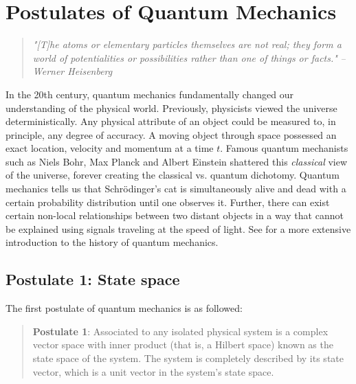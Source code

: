 
\chapter{Postulates of Quantum Mechanics} %

\label{Chapter3-postulates} %

\begin{quote}
\textit{"[T]he atoms or elementary particles themselves are not real; they form a world of potentialities or possibilities rather than one of things or facts."}
\bigskip
\hfill \textit{--Werner Heisenberg}
\end{quote}

In the 20th century, quantum mechanics fundamentally changed our understanding of the physical world.  Previously, physicists viewed the universe deterministically.  Any physical attribute of an object could be measured to, in principle, any degree of accuracy.  A moving object through space possessed an exact location, velocity and momentum at a time $t$. Famous quantum mechanists such as Niels Bohr, Max Planck and Albert Einstein shattered this {\emph{classical}} view of the universe, forever creating the classical vs. quantum dichotomy. Quantum mechanics tells us that Schrödinger's cat is simultaneously alive and dead with a certain probability distribution until one observes it. Further, there can exist certain non-local relationships between two distant objects in a way that cannot be explained using signals traveling at the speed of light. See \cite{dorai2018} for a more extensive introduction to the history of quantum mechanics.


\section{Postulate 1: State space}

The first postulate of quantum mechanics is as followed: 
\begin{quote}
    \textbf{Postulate 1}: Associated to any isolated physical system is a complex vector space with inner product (that is, a Hilbert space) known as the state space of the system. The system is completely described by its state vector, which is a unit vector in the system's state space.
\end{quote}

